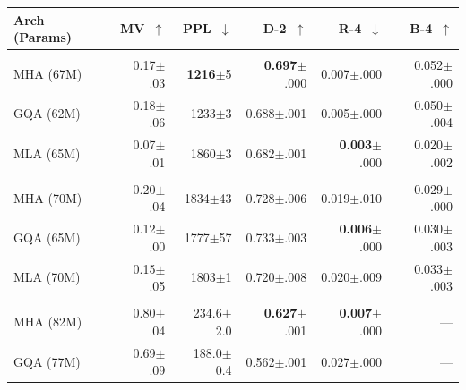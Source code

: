 \begin{table}[t]
\centering
\footnotesize
\renewcommand{\arraystretch}{1.2}
\setlength{\tabcolsep}{3pt}
\begin{tabular}{@{} l rrrrr @{}}
\toprule
\textbf{Arch (Params)}
  & MV~$\uparrow$ & PPL~$\downarrow$
  & D-2~$\uparrow$ & R-4~$\downarrow$ & B-4~$\uparrow$ \\
\midrule
%
\rowcolor{gray!10}
\multicolumn{6}{@{}l}{\textbf{Autoregressive}} \\
\quad MHA (67M)  & 0.17{\tiny$\pm$.03} & \textbf{1216}{\tiny$\pm$5} & \textbf{0.697}{\tiny$\pm$.000} & 0.007{\tiny$\pm$.000} & 0.052{\tiny$\pm$.000} \\
\quad GQA (62M)  & 0.18{\tiny$\pm$.06} & 1233{\tiny$\pm$3}          & 0.688{\tiny$\pm$.001}          & 0.005{\tiny$\pm$.000} & 0.050{\tiny$\pm$.004} \\
\quad MLA (65M)  & 0.07{\tiny$\pm$.01} & 1860{\tiny$\pm$3}          & 0.682{\tiny$\pm$.001}          & \textbf{0.003}{\tiny$\pm$.000} & 0.020{\tiny$\pm$.002} \\
%
\midrule
%
\rowcolor{gray!10}
\multicolumn{6}{@{}l}{\textbf{Discrete Diffusion}} \\
\quad MHA (70M)  & 0.20{\tiny$\pm$.04} & 1834{\tiny$\pm$43} & 0.728{\tiny$\pm$.006} & 0.019{\tiny$\pm$.010} & 0.029{\tiny$\pm$.000} \\
\quad GQA (65M)  & 0.12{\tiny$\pm$.00} & 1777{\tiny$\pm$57} & 0.733{\tiny$\pm$.003} & \textbf{0.006}{\tiny$\pm$.000} & 0.030{\tiny$\pm$.003} \\
\quad MLA (70M)  & 0.15{\tiny$\pm$.05} & 1803{\tiny$\pm$1}  & 0.720{\tiny$\pm$.008} & 0.020{\tiny$\pm$.009} & 0.033{\tiny$\pm$.003} \\
%
\midrule
%
\rowcolor{gray!10}
\multicolumn{6}{@{}l}{\textbf{Continuous Flow-Matching}} \\
\quad MHA (82M)  & 0.80{\tiny$\pm$.04} & 234.6{\tiny$\pm$2.0}          & \textbf{0.627}{\tiny$\pm$.001} & \textbf{0.007}{\tiny$\pm$.000} & --- \\
\quad GQA (77M)  & 0.69{\tiny$\pm$.09} & 188.0{\tiny$\pm$0.4}          & 0.562{\tiny$\pm$.001}          & 0.027{\tiny$\pm$.000}          & --- \\

\end{tabular}
\end{table}
